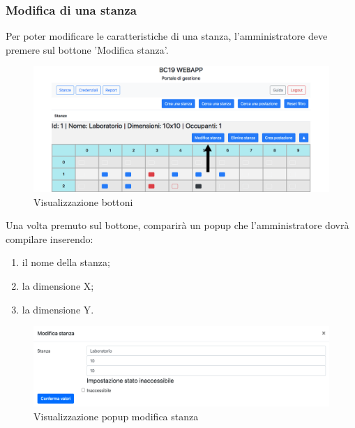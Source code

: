 \subsubsection{Modifica di una stanza}
Per poter modificare le caratteristiche di una stanza, l'amministratore deve premere sul bottone 'Modifica stanza'.
\begin{figure}[H]
	\centering
	\includegraphics[width=15cm]{res/images/bottoneEditRoom.png}
	\caption{Visualizzazione bottoni}
\end{figure}
Una volta premuto sul bottone, comparirà un popup che l'amministratore dovrà compilare inserendo:
\begin{enumerate}
	\item il nome della stanza;
	\item la dimensione X;
	\item la dimensione Y.
\end{enumerate}
\begin{figure}[H]
	\centering
	\includegraphics[width=15cm]{res/images/modificaStanza.png}
	\caption{Visualizzazione popup modifica stanza}
\end{figure}

